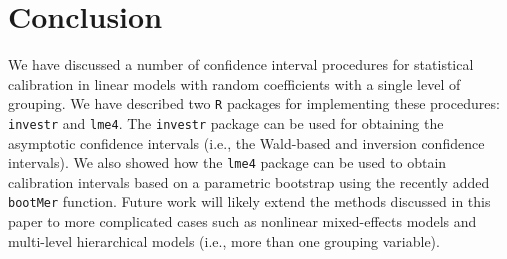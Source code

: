 \documentclass{article}\usepackage[]{graphicx}\usepackage[]{color}
\begin{document}
\section{Conclusion}

We have discussed a number of confidence interval procedures for statistical calibration in linear models with random coefficients with a single level of grouping.  We have described two \texttt{R} packages for implementing these procedures: \texttt{investr} and \texttt{lme4}.  The \texttt{investr} package can be used for obtaining the asymptotic confidence intervals (i.e., the Wald-based and inversion confidence intervals).  We also showed how the \texttt{lme4} package can be used to obtain calibration intervals based on a parametric bootstrap using the recently added \texttt{bootMer} function.  Future work will likely extend the methods discussed in this paper to more complicated cases such as nonlinear mixed-effects models and multi-level hierarchical models (i.e., more than one grouping variable).



\end{document}
